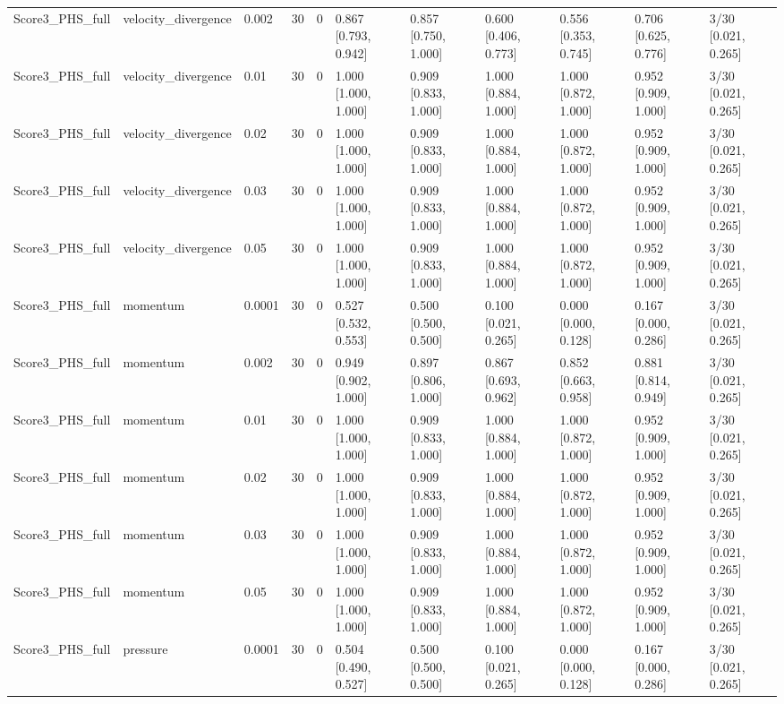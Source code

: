 \begin{longtable}{lllllllllll}
Score3\_PHS\_full & velocity\_divergence & 0.002 & 30 & 0 & 0.867 [0.793, 0.942] & 0.857 [0.750, 1.000] & 0.600 [0.406, 0.773] & 0.556 [0.353, 0.745] & 0.706 [0.625, 0.776] & 3/30 [0.021, 0.265] \\
Score3\_PHS\_full & velocity\_divergence & 0.01 & 30 & 0 & 1.000 [1.000, 1.000] & 0.909 [0.833, 1.000] & 1.000 [0.884, 1.000] & 1.000 [0.872, 1.000] & 0.952 [0.909, 1.000] & 3/30 [0.021, 0.265] \\
Score3\_PHS\_full & velocity\_divergence & 0.02 & 30 & 0 & 1.000 [1.000, 1.000] & 0.909 [0.833, 1.000] & 1.000 [0.884, 1.000] & 1.000 [0.872, 1.000] & 0.952 [0.909, 1.000] & 3/30 [0.021, 0.265] \\
Score3\_PHS\_full & velocity\_divergence & 0.03 & 30 & 0 & 1.000 [1.000, 1.000] & 0.909 [0.833, 1.000] & 1.000 [0.884, 1.000] & 1.000 [0.872, 1.000] & 0.952 [0.909, 1.000] & 3/30 [0.021, 0.265] \\
Score3\_PHS\_full & velocity\_divergence & 0.05 & 30 & 0 & 1.000 [1.000, 1.000] & 0.909 [0.833, 1.000] & 1.000 [0.884, 1.000] & 1.000 [0.872, 1.000] & 0.952 [0.909, 1.000] & 3/30 [0.021, 0.265] \\
Score3\_PHS\_full & momentum & 0.0001 & 30 & 0 & 0.527 [0.532, 0.553] & 0.500 [0.500, 0.500] & 0.100 [0.021, 0.265] & 0.000 [0.000, 0.128] & 0.167 [0.000, 0.286] & 3/30 [0.021, 0.265] \\
Score3\_PHS\_full & momentum & 0.002 & 30 & 0 & 0.949 [0.902, 1.000] & 0.897 [0.806, 1.000] & 0.867 [0.693, 0.962] & 0.852 [0.663, 0.958] & 0.881 [0.814, 0.949] & 3/30 [0.021, 0.265] \\
Score3\_PHS\_full & momentum & 0.01 & 30 & 0 & 1.000 [1.000, 1.000] & 0.909 [0.833, 1.000] & 1.000 [0.884, 1.000] & 1.000 [0.872, 1.000] & 0.952 [0.909, 1.000] & 3/30 [0.021, 0.265] \\
Score3\_PHS\_full & momentum & 0.02 & 30 & 0 & 1.000 [1.000, 1.000] & 0.909 [0.833, 1.000] & 1.000 [0.884, 1.000] & 1.000 [0.872, 1.000] & 0.952 [0.909, 1.000] & 3/30 [0.021, 0.265] \\
Score3\_PHS\_full & momentum & 0.03 & 30 & 0 & 1.000 [1.000, 1.000] & 0.909 [0.833, 1.000] & 1.000 [0.884, 1.000] & 1.000 [0.872, 1.000] & 0.952 [0.909, 1.000] & 3/30 [0.021, 0.265] \\
Score3\_PHS\_full & momentum & 0.05 & 30 & 0 & 1.000 [1.000, 1.000] & 0.909 [0.833, 1.000] & 1.000 [0.884, 1.000] & 1.000 [0.872, 1.000] & 0.952 [0.909, 1.000] & 3/30 [0.021, 0.265] \\
Score3\_PHS\_full & pressure & 0.0001 & 30 & 0 & 0.504 [0.490, 0.527] & 0.500 [0.500, 0.500] & 0.100 [0.021, 0.265] & 0.000 [0.000, 0.128] & 0.167 [0.000, 0.286] & 3/30 [0.021, 0.265] \\

\end{longtable}
